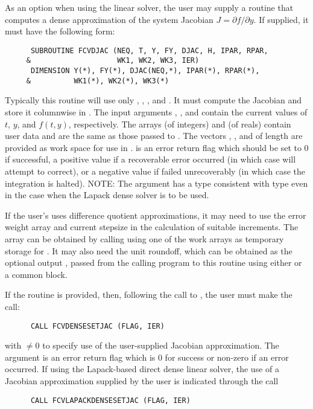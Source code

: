 \begin{Steps}
  As an option when using the {\dense} linear solver, the user may supply a
  routine that computes a dense approximation of the system Jacobian 
  $J = \partial f / \partial y$. If supplied, it must have the following form:
\begin{verbatim}
      SUBROUTINE FCVDJAC (NEQ, T, Y, FY, DJAC, H, IPAR, RPAR,
     &                    WK1, WK2, WK3, IER)
      DIMENSION Y(*), FY(*), DJAC(NEQ,*), IPAR(*), RPAR(*),
     &          WK1(*), WK2(*), WK3(*)
\end{verbatim}
  Typically this routine will use only , , , and . 
  It must compute the Jacobian and store it columnwise in .
  The input arguments , , and  contain the current
  values of $t$, $y$, and $f(t,y)$, respectively.
  The arrays  (of integers) and  (of reals) contain user data
  and are the same as those passed to .
  The vectors , , and 
  of length  are provided as work space for use in .
   is an error return flag which should be set to $0$ if successful, 
  a positive value if a recoverable error occurred (in which case {\cvode} will 
  attempt to correct), or a negative value if  failed unrecoverably 
  (in which case the integration is halted).
  NOTE: The argument  has a type consistent with {\C} type 
  even in the case when the Lapack dense solver is to be used.

  If the user's  uses difference quotient approximations, it
  may need to use the error weight array  and current stepsize 
  in the calculation of suitable increments.  The array  can be
  obtained by calling  using one of the work arrays as
  temporary storage for .  It may also need the unit roundoff,
  which can be obtained as the optional output , passed from
  the calling program to this routine using either  or a common block.

  If the  routine is provided, then, following the call to , 
  the user must make the call:
\begin{verbatim}
      CALL FCVDENSESETJAC (FLAG, IER)
\end{verbatim}
  with  $\neq 0$ to specify use of the user-supplied Jacobian
  approximation.  The argument  is an error return flag which is $0$ 
  for success or non-zero if an error occurred.
  If using the Lapack-based direct dense linear solver, the use of a
  Jacobian approximation supplied by the user is indicated through the call
\begin{verbatim}
      CALL FCVLAPACKDENSESETJAC (FLAG, IER)
\end{verbatim}


\end{Steps}
